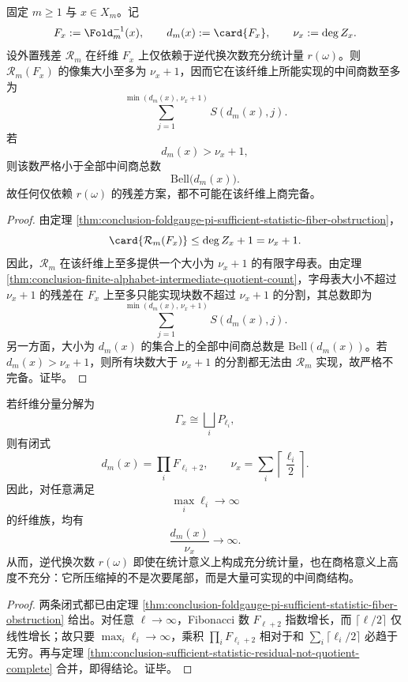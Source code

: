 \begin{theorem}[仅依赖充分统计量的残差不可能商完备]\label{thm:conclusion-sufficient-statistic-residual-not-quotient-complete}
固定 \(m\ge 1\) 与 \(x\in X_m\)。记
\[
F_x:=\Fold_m^{-1}(x),
\qquad
d_m(x):=\card{F_x},
\qquad
\nu_x:=\deg Z_x.
\]
设外置残差 \(\mathcal R_m\) 在纤维 \(F_x\) 上仅依赖于逆代换次数充分统计量 \(r(\omega)\)。则 \(\mathcal R_m(F_x)\) 的像集大小至多为 \(\nu_x+1\)，因而它在该纤维上所能实现的中间商数至多为
\[
\sum_{j=1}^{\min(d_m(x),\,\nu_x+1)}S(d_m(x),j).
\]
若
\[
d_m(x)>\nu_x+1,
\]
则该数严格小于全部中间商总数
\[
\mathrm{Bell}\bigl(d_m(x)\bigr).
\]
故任何仅依赖 \(r(\omega)\) 的残差方案，都不可能在该纤维上商完备。
\end{theorem}
\begin{proof}
由定理 \ref{thm:conclusion-foldgauge-pi-sufficient-statistic-fiber-obstruction}，
\[
\card{\mathcal R_m(F_x)}\le \deg Z_x+1=\nu_x+1.
\]
因此，\(\mathcal R_m\) 在该纤维上至多提供一个大小为 \(\nu_x+1\) 的有限字母表。由定理 \ref{thm:conclusion-finite-alphabet-intermediate-quotient-count}，字母表大小不超过 \(\nu_x+1\) 的残差在 \(F_x\) 上至多只能实现块数不超过 \(\nu_x+1\) 的分割，其总数即为
\[
\sum_{j=1}^{\min(d_m(x),\,\nu_x+1)}S(d_m(x),j).
\]
另一方面，大小为 \(d_m(x)\) 的集合上的全部中间商总数是 \(\mathrm{Bell}(d_m(x))\)。若 \(d_m(x)>\nu_x+1\)，则所有块数大于 \(\nu_x+1\) 的分割都无法由 \(\mathcal R_m\) 实现，故严格不完备。证毕。
\end{proof}

\begin{corollary}[统计充分性与商充分性的严格分裂]\label{cor:conclusion-statistical-sufficiency-vs-quotient-sufficiency-separation}
若纤维分量分解为
\[
\Gamma_x \cong \bigsqcup_i P_{\ell_i},
\]
则有闭式
\[
d_m(x)=\prod_i F_{\ell_i+2},
\qquad
\nu_x=\sum_i \left\lceil\frac{\ell_i}{2}\right\rceil.
\]
因此，对任意满足
\[
\max_i\ell_i\to\infty
\]
的纤维族，均有
\[
\frac{d_m(x)}{\nu_x}\to\infty.
\]
从而，逆代换次数 \(r(\omega)\) 即使在统计意义上构成充分统计量，也在商格意义上高度不充分：它所压缩掉的不是次要尾部，而是大量可实现的中间商结构。
\end{corollary}
\begin{proof}
两条闭式都已由定理 \ref{thm:conclusion-foldgauge-pi-sufficient-statistic-fiber-obstruction} 给出。对任意 \(\ell\to\infty\)，Fibonacci 数 \(F_{\ell+2}\) 指数增长，而 \(\lceil \ell/2\rceil\) 仅线性增长；故只要 \(\max_i\ell_i\to\infty\)，乘积 \(\prod_i F_{\ell_i+2}\) 相对于和 \(\sum_i\lceil \ell_i/2\rceil\) 必趋于无穷。再与定理 \ref{thm:conclusion-sufficient-statistic-residual-not-quotient-complete} 合并，即得结论。证毕。
\end{proof}

